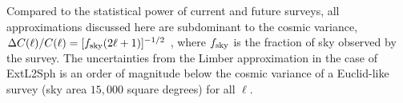 \documentclass[fleqn,usenatbib]{mnras} %
\begin{document}
Compared to the statistical power of current and future surveys, all
approximations discussed here are subdominant to the cosmic variance, $\Delta
C(\ell) / C(\ell) = [f_{\rm sky} (2 \ell + 1)]^{-1/2}$
\citep{1992ApJ...388..272K}, where $f_{\rm sky}$ is the fraction of sky observed
by the survey. The uncertainties from the Limber approximation in the case of
ExtL2Sph is an order of magnitude below the cosmic variance of a Euclid-like
survey (sky area $15,000$ square degrees) for all $\ell$.




\begin{figure}

  \begin{center}
\end{center}
\end{figure}
\end{document}
